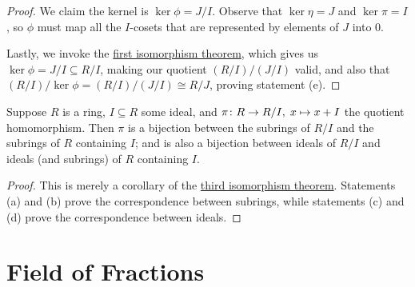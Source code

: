 \begin{proof}
    We claim the kernel is \(\ker\phi = J/I\).
    Observe that \(\ker\eta = J\) and \(\ker\pi = I\),
    so \(\phi\) must map all the \(I\)-cosets
    that are represented by elements of \(J\) into \(0\).

    Lastly, we invoke the \hyperref[thm:iso-1-ring]{first isomorphism theorem},
    which gives us \(\ker\phi = J/I \subseteq R/I\),
    making our quotient \((R/I)/(J/I)\) valid,
    and also that \((R/I)/\ker\phi = (R/I)/(J/I) \cong R/J\),
    proving statement (e).
\end{proof}

\begin{theorem}\label{thm:iso-4-ring}
    Suppose \(R\) is a ring, \(I \subseteq R\) some ideal,
    and \(\pi\colon R\to R/I,\;x\mapsto x+I\) the quotient homomorphism.
    Then \(\pi\) is a bijection between the subrings of \(R/I\)
    and the subrings of \(R\) containing \(I\);
    and is also a bijection between ideals of \(R/I\)
    and ideals (and subrings) of \(R\) containing \(I\).
\end{theorem}
\begin{proof}
    This is merely a corollary of
    the \hyperref[thm:iso-3-ring]{third isomorphism theorem}.
    Statements (a) and (b) prove the correspondence between subrings,
    while statements (c) and (d) prove the correspondence between ideals.
\end{proof}


\section{Field of Fractions}

